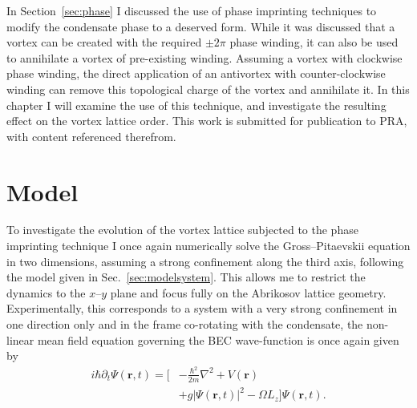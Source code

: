 In Section~\ref{sec:phase} I discussed the use of phase imprinting techniques to modify the condensate phase to a deserved form. While it was discussed that a vortex can be created with the required $\pm 2\pi$ phase winding, it can also be used to annihilate a vortex of pre-existing winding. Assuming a vortex with clockwise phase winding, the direct application of an antivortex with counter-clockwise winding can remove this topological charge of the vortex and annihilate it. In this chapter I will examine the use of this technique, and investigate the resulting effect on the vortex lattice order. This work is submitted for publication to PRA, with content referenced therefrom.


\section{Model}\label{sec:model}

To investigate the evolution of the vortex lattice subjected to the phase imprinting technique I once again numerically solve the Gross--Pitaevskii equation in two dimensions, assuming a strong confinement along the third axis, following the model given in Sec.~\ref{sec:modelsystem}. This allows me to restrict the dynamics to the $x$--$y$ plane and focus fully on the Abrikosov lattice geometry. Experimentally, this corresponds to a system with a very strong confinement in one direction only \cite{BEC:Stock_lpl_2004,BEC:Seo_jkps_2014,BEC:Chomaz_natcom_2015} and in the frame co-rotating with the condensate, the non-linear mean field equation governing the BEC wave-function is once again given by
\begin{align}
	i\hbar\partial_t \Psi(\mathbf{r},t) = \Big[&-\frac{\hbar^2}{2m}\nabla^2 + V\left(\mathbf{r}\right) \nonumber\\
	&+ g\vert \Psi(\mathbf{r},t) \vert^2- \Omega L_z \Big]\Psi(\mathbf{r},t).
\end{align}


